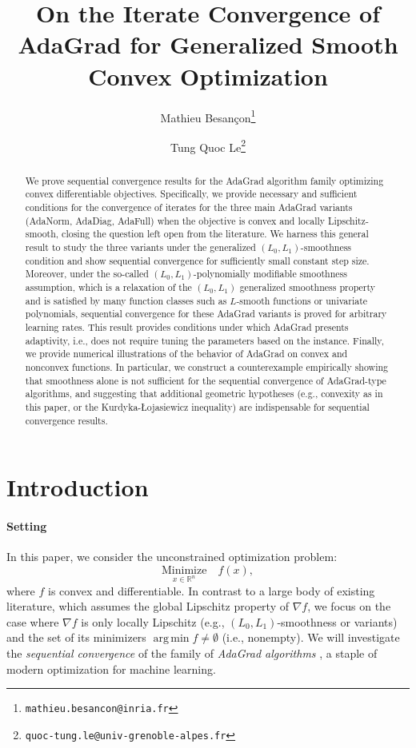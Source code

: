 \documentclass{article}
\title{On the Iterate Convergence of AdaGrad for Generalized Smooth Convex Optimization}
\author[1]{%
Mathieu Besançon\thanks{\texttt{mathieu.besancon@inria.fr}}%
}
\author[2]{%
Tung Quoc Le\thanks{\texttt{quoc-tung.le@univ-grenoble-alpes.fr}}%
}
\affil[2]{Université Grenoble Alpes, LJK, CNRS}
\affil[1]{Université Grenoble Alpes, Inria, LIG, CNRS}
\theoremstyle{plain}
\theoremstyle{definition}
\theoremstyle{remark}
\newcommand{\argmin}{\operatorname{arg\,min}}
\newcommand*{\RR}{\mathbb{R}}
\begin{document}
\maketitle

\begin{abstract}
We prove sequential convergence results for the AdaGrad algorithm family optimizing convex differentiable objectives. Specifically, we provide necessary and sufficient conditions for the convergence of iterates for the three main AdaGrad variants (AdaNorm, AdaDiag, AdaFull) when the objective is convex and locally Lipschitz-smooth, closing the question left open from the literature.
We harness this general result to study the three variants under the generalized $(L_0,L_1)$-smoothness condition and show sequential convergence for sufficiently small constant step size. Moreover, under the so-called $(L_0,L_1)$-polynomially modifiable smoothness assumption, which is a relaxation of the $(L_0,L_1)$ generalized smoothness property and is satisfied by many function classes such as $L$-smooth functions or univariate polynomials, sequential convergence for these AdaGrad variants is proved for arbitrary learning rates. This result provides conditions under which AdaGrad presents adaptivity, i.e., does not require tuning the parameters based on the instance.
Finally, we provide numerical illustrations of the behavior of AdaGrad on convex and nonconvex functions. In particular, we construct a counterexample empirically showing that smoothness alone is not sufficient for the sequential convergence of AdaGrad-type algorithms, and suggesting that additional geometric hypotheses (e.g., convexity as in this paper, or the Kurdyka-\L ojasiewicz inequality) are indispensable for sequential convergence results.
\end{abstract}

\section{Introduction}\label{sec:intro}
\paragraph{Setting} In this paper, we consider the unconstrained optimization problem:
\begin{equation*}
    \underset{x \in \RR^n}{\mathrm{Minimize}} \quad f(x),
\end{equation*}
where $f$ is convex and differentiable.
In contrast to a large body of existing literature, which assumes the global Lipschitz property of $\nabla f$, we focus on the case where $\nabla f$ is only locally Lipschitz (e.g., $(L_0,L_1)$-smoothness or variants) and the set of its minimizers $\argmin f \neq \emptyset$ (i.e., nonempty). We will investigate the \emph{sequential convergence} of the family of \emph{AdaGrad algorithms} \citep{duchi2011adaptive}, a staple of modern optimization for machine learning.
\end{document}
